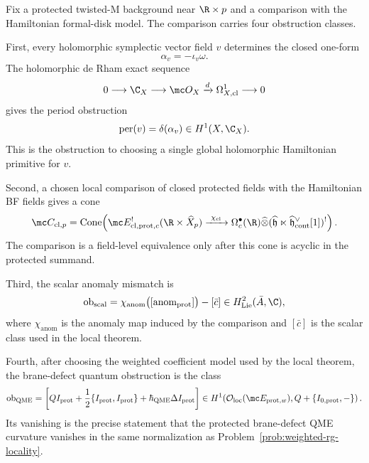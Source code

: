 \begin{defn}\label{defn:protected-twist-obstruction-datum}
  Fix a protected twisted-M background near
  \(\R\times p\) and a comparison with the Hamiltonian
  formal-disk model.  The comparison carries four obstruction classes.

  First, every holomorphic symplectic vector field \(v\) determines the
  closed one-form
  \[
    \alpha_v=-\iota_v\omega.
  \]
  The holomorphic de Rham exact sequence
  \[
    0\longrightarrow\C_X\longrightarrow\mc O_X
      \xrightarrow{d}\Omega^1_{X,\mathrm{cl}}\longrightarrow0
  \]
  gives the period obstruction
  \[
    \operatorname{per}(v)=\delta(\alpha_v)\in H^1(X,\C_X).
  \]
  This is the obstruction to choosing a single global holomorphic
  Hamiltonian primitive for \(v\).

  Second, a chosen local comparison of closed protected fields with the
  Hamiltonian BF fields gives a cone
  \[
  \mc C_{\mathrm{cl},p}=
  \operatorname{Cone}\!\left(
    \mc E_{\mathrm{cl},\mathrm{prot},c}^{!}(\R\times\widehat X_p)
      \xrightarrow{\ \chi_{\mathrm{cl}}\ }
    \Omega^\bullet_c(\R)\widehat\otimes
      (\widehat{\mathfrak h}\ltimes
       \widehat{\mathfrak h}^{\vee}_{\mathrm{cont}}[1])^{!}
  \right).
  \]
  The comparison is a field-level equivalence only after this cone is
  acyclic in the protected summand.

  Third, the scalar anomaly mismatch is
  \[
    \operatorname{ob}_{\mathrm{scal}}
      =
    \chi_{\mathrm{anom}}\bigl([\operatorname{anom}_{\mathrm{prot}}]\bigr)
      -[\bar c]\in H^2_{\mathrm{Lie}}(\bar A,\C),
  \]
  where \(\chi_{\mathrm{anom}}\) is the anomaly map induced by the
  comparison and \([\bar c]\) is the scalar class used in the local
  theorem.

  Fourth, after choosing the weighted coefficient model used by the
  local theorem, the brane-defect quantum obstruction is the class
  \[
  \operatorname{ob}_{\mathrm{QME}}=
  \left[
    QI_{\mathrm{prot}}
    +\frac12\{I_{\mathrm{prot}},I_{\mathrm{prot}}\}
    +\hbar_{\mathrm{QME}}\Delta I_{\mathrm{prot}}
  \right]
  \in
  H^1\!\left(
    \mathcal O_{\mathrm{loc}}(\mc E_{\mathrm{prot},w}),
    Q+\{I_{0,\mathrm{prot}},-\}
  \right).
  \]
  Its vanishing is the precise statement that the protected brane-defect
  QME curvature vanishes in the same normalization as
  Problem~\ref{prob:weighted-rg-locality}.
\end{defn}

